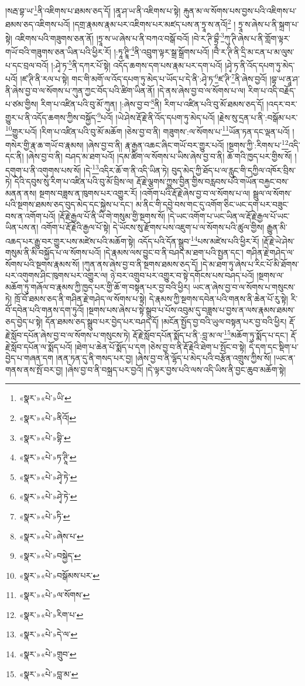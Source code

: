 །སརྦ་བྷ་ཡ་\footnote{«སྣར་»«པེ་»ཡི་}ནི་འཇིགས་པ་ཐམས་ཅད་དོ། །ནཱ་ཤ་ཡ་ནི་འཇིགས་པ་སྟེ། རྐུན་མ་ལ་སོགས་པས་བྱས་པའི་འཇིགས་པ་ཐམས་ཅད་འཇིགས་པའོ། །དགྲ་རྣམས་རྣམ་པར་འཇིགས་པར་མཛད་པས་ན་ཏྲཱ་ས་ནའོ།\footnote{«སྣར་»«པེ་»ནིའོ།} །
ཏྲཱ་ས་ཞེས་པ་ནི་སྐྲག་པ་སྟེ། འཇིགས་པའི་གཟུགས་ཅན་ནོ། །ཏྲཱ་ས་ཡ་ཞེས་པ་ནི་བཀའ་བསྒོ་བའོ། །བེ་ར་ཊི་བྷྲྀ་\footnote{«སྣར་»«པེ་»བྷི་}ཀུ་ཊི་ཞེས་པ་ནི་གློག་ལྟར་གཡོ་བའི་གཟུགས་ཅན་ཡིན་པའི་ཕྱིར་རོ། །:ཏཱ་ཊྲཱི་\footnote{«སྣར་»«པེ་»ཏ་ཊཱི་}ནི་འབྲུག་ལྟར་སྒྲ་སྒྲོགས་པའོ། །བཻ་ར་ཊི་ནི་དྲི་མ་ངན་པ་མ་ལུས་པ་དང་བྲལ་བའོ། །:ཤྭེ་ཏ་\footnote{«སྣར་»«པེ་»ཤྭེ་ཏེ་}ནི་དཀར་པོ་སྟེ། འདོད་ཆགས་དག་པས་རྣམ་པར་དག་པའོ། །ཤྭེ་ཏ་ནི་འོད་དཔག་ཏུ་མེད་པའོ། །ཛ་ཊི་ནི་རལ་པ་སྟེ། གང་གི་མགོ་ལ་འོད་དཔག་ཏུ་མེད་པ་ཡོད་པ་དེ་ནི་:ཤྭེ་ཏ་\footnote{«སྣར་»«པེ་»ཤྭེ་ཏེ་}ཛ་ཊི་\footnote{«སྣར་»«པེ་»ཏི་}ནི་ཞེས་བྱའོ། །བྷ་ཡ་ནཱ་ཤ་ནི་ཞེས་བྱ་བ་ལ་སོགས་པ་ཀུན་ཀྱང་བོད་པའི་ཚིག་ཡིན་ནོ། །དེ་ནས་ཞེས་བྱ་བ་ལ་སོགས་པ་ལ། རིག་པ་འདི་བརྗོད་པ་ཙམ་གྱིས། རིག་པ་འཛིན་པའི་བུ་མོ་ཀུན། །:ཞེས་བྱ་བ་\footnote{«སྣར་»«པེ་»ཞེས་པ་}ནི། རིག་པ་འཛིན་པའི་བུ་མོ་ཐམས་ཅད་དོ། །འདར་བར་གྱུར་པ་ནི་འདོད་ཆགས་ཀྱིས་བསྐྱོད་\footnote{«སྣར་»«པེ་»བསྐྱེད་}པའོ། །ཡེ་ཤེས་རྡོ་རྗེ་ནི་འོད་དཔག་ཏུ་མེད་པའོ། །རྗེས་སུ་དྲན་པ་ནི་:བསྒོམ་པར་\footnote{«སྣར་»«པེ་»བསྒོམས་པར་}གྱུར་པའོ། །རིག་པ་འཛིན་པའི་བུ་མོ་མཆོག །ཅེས་བྱ་བ་ནི། གཟུགས་:ལ་སོགས་པ་\footnote{«སྣར་»«པེ་»ལ་སོགས་}ཡོན་ཏན་དང་ལྡན་པའོ། །གསེར་གྱི་རྣ་ཆ་གཡོ་བ་རྣམས། །ཞེས་བྱ་བ་ནི། རྣ་རྒྱན་འཆང་ཞིང་གཡོ་བར་གྱུར་པའོ། །སྔགས་ཀྱི་:རིགས་པ་\footnote{«སྣར་»«པེ་»རིག་པ་}འདི་དང་ནི། །ཞེས་བྱ་བ་ནི། བཤད་མ་ཐག་པའོ། །དམ་ཚིག་ལ་སོགས་པ་ཡིས་ཞེས་བྱ་བ་ནི། ཆོ་གའི་ཁྱད་པར་གྱིས་སོ། །དགུག་པ་ནི་འགུགས་པས་སོ། །དེ་\footnote{«སྣར་»«པེ་»དེ་ལ་}འདིར་ཆོ་ག་ནི་འདི་ཡིན་ཏེ། བུད་མེད་ཀྱི་ཐོད་པ་ལ་རླུང་གི་དཀྱིལ་འཁོར་བྲིས་ཏེ། དེའི་དབུས་སུ་རིག་པ་འཛིན་པའི་བུ་མོ་བྲིས་ལ། རྡོ་རྗེ་ལྕགས་ཀྱུས་བྱིན་གྱིས་བརླབས་པའི་གཡོན་བརྐྱང་བས་མནན་ནས། སྔགས་བཟླས་ན་ཁུགས་པར་འགྱུར་རོ། །འགོག་པའི་རྡོ་རྗེ་ཞེས་བྱ་བ་ལ་སོགས་པ་ལ། སྦྲུལ་ལ་སོགས་པའི་སྔགས་ཐམས་ཅད་བུད་མེད་དང་སྐྱེས་པ་དང་། མ་ནིང་གི་དབྱེ་བས་གང་དུ་འགོག་ཅིང་ཡང་དག་པར་བཟུང་བས་ན་འགོག་པའོ། །རྡོ་རྗེ་རྒྱལ་པོ་ནི་ཡི་གེ་གསུམ་གྱི་སྔགས་སོ། །དེ་ཡང་འགོག་པ་ཡང་ཡིན་ལ་རྡོ་རྗེ་རྒྱལ་པོ་ཡང་ཡིན་པས་ན། འགོག་པ་རྡོ་རྗེའི་རྒྱལ་པོ་སྟེ། དེ་ཡོངས་སུ་རྫོགས་པས་འཇུག་པ་ལ་སོགས་པའི་ཚུལ་གྱིས། རྒྱུན་མི་འཆད་པར་རྒྱུ་བར་གྱུར་པས་མཛེས་པའི་མཆོག་སྟེ། འདོད་པའི་དོན་སྒྲུབ་\footnote{«སྣར་»«པེ་»གྲུབ་}པས་མཛེས་པའི་ཕྱིར་རོ། །རྡོ་རྗེ་ཡེ་ཤེས་གསུམ་ནི་མི་བསྐྱོད་པ་ལ་སོགས་པའོ། །དེ་རྣམས་ལས་བྱུང་བ་ནི་བཤད་མ་ཐག་པའི་སྤྱན་དང་། གཤིན་རྗེ་གཤེད་ལ་སོགས་པའི་སྔགས་རྣམས་སོ། །ཀུན་ནས་ཞེས་བྱ་བ་ནི་སྔགས་ཐམས་ཅད་དོ། །དེ་མ་ཐག་ཏུ་ཞེས་པ་རིང་པོ་མི་ཐོགས་པར་འགུགས་ཤིང་ཁུགས་པར་འགྱུར་ལ། ཉེ་བར་འགྲུབ་པར་འགྱུར་བ་སྟེ་དགོངས་པས་བཤད་པའོ། །སྔགས་ལ་མཆོག་ཏུ་གཞོལ་བ་རྣམས་ཀྱི་ཁྱད་པར་གྱི་ཆོ་ག་བསྟན་པར་བྱ་བའི་ཕྱིར། ཡང་ན་ཞེས་བྱ་བ་ལ་སོགས་པ་གསུངས་ཏེ། ཁྲོ་བོ་ཐམས་ཅད་ནི་གཤིན་རྗེ་གཤེད་ལ་སོགས་པ་སྟེ། དེ་རྣམས་ཀྱི་སྔགས་དབེན་པའི་གནས་ནི་ཆེན་པོ་རུ་སྟེ། རི་བོ་དབེན་པའི་གནས་དག་ཏུའོ། །སྔགས་པས་ཞེས་པ་སྟེ་སྒྲུབ་པ་པོས་འབུམ་དུ་བཟླས་པ་བྱས་ན་ལས་རྣམས་ཐམས་ཅད་བྱེད་པ་སྟེ། དོན་ཐམས་ཅད་སྒྲུབ་པར་བྱེད་པར་བཤད་དོ། །མངོན་སྤྱོད་བྱ་བའི་ཡུལ་བསྟན་པར་བྱ་བའི་ཕྱིར། རྡོ་རྗེ་སློབ་དཔོན་ཞེས་བྱ་བ་ལ་སོགས་པ་གསུངས་ཏེ། རྡོ་རྗེ་སློབ་དཔོན་སྨོད་པ་ནི་:བླ་མ་ལ་\footnote{«སྣར་»«པེ་»བླ་མ་}མཆོག་ཏུ་སྨོད་པ་དང་། རྡོ་རྗེ་སློབ་དཔོན་ལ་སྨོད་པའོ། །ཐེག་པ་ཆེན་པོ་སྨོད་པ་དག །ཅེས་བྱ་བ་ནི་རྡོ་རྗེའི་ཐེག་པ་སྤོང་བ་སྟེ། དེ་དག་དང་སྡིག་པ་བྱེད་པ་གཞན་དག །ནན་ཏན་དུ་ནི་གསད་པར་བྱ། །ཞེས་བྱ་བ་ནི་ལྷོད་པ་མེད་པའི་བརྩོན་འགྲུས་ཀྱིས་སོ། །ཡང་ན་གནས་ནས་སྤོ་བར་བྱ། །ཞེས་བྱ་བ་ནི་བསྐྲད་པར་བྱའོ། །དེ་ལྟར་བྱས་པའི་ལས་འདི་ཡིས་ནི་བྱང་ཆུབ་མཆོག་སྟེ། 